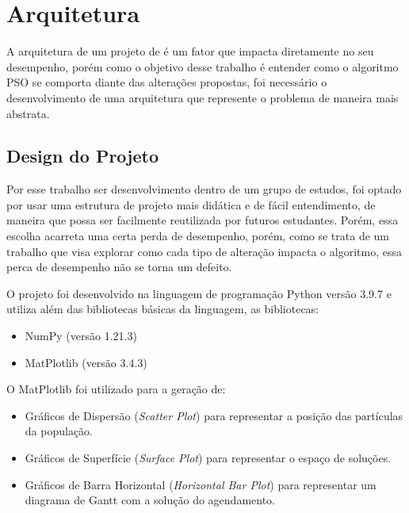 \section{Arquitetura}
        A arquitetura de um projeto de é um fator que impacta diretamente no seu desempenho, porém como o objetivo desse trabalho é entender como o algoritmo PSO se comporta diante das alterações propostas, foi necessário o desenvolvimento de uma arquitetura que represente o problema de maneira mais abstrata.

    \subsection{Design do Projeto}
        Por esse trabalho ser desenvolvimento dentro de um grupo de estudos, foi optado por usar uma estrutura de projeto mais didática e de fácil entendimento, de maneira que possa ser facilmente reutilizada por futuros estudantes. Porém, essa escolha acarreta uma certa perda de desempenho, porém, como se trata de um trabalho que visa explorar como cada tipo de alteração impacta o algoritmo, essa perca de desempenho não se torna um defeito.\newline
        
        O projeto foi desenvolvido na linguagem de programação Python versão 3.9.7 e utiliza além das bibliotecas básicas da linguagem, as bibliotecas:
        \begin{itemize}
            \item NumPy (versão 1.21.3)
            \item MatPlotlib (versão 3.4.3)
        \end{itemize}

        \hfill\newline
        \noindent O MatPlotlib foi utilizado para a geração de: 
        \begin{itemize}
            \item Gráficos de Dispersão (\textit{Scatter Plot}) para representar a posição das partículas da população.
            \item Gráficos de Superfície (\textit{Surface Plot}) para representar o espaço de soluções.
            \item Gráficos de Barra Horizontal (\textit{Horizontal Bar Plot}) para representar um diagrama de Gantt com a solução do agendamento.
        \end{itemize}
        
